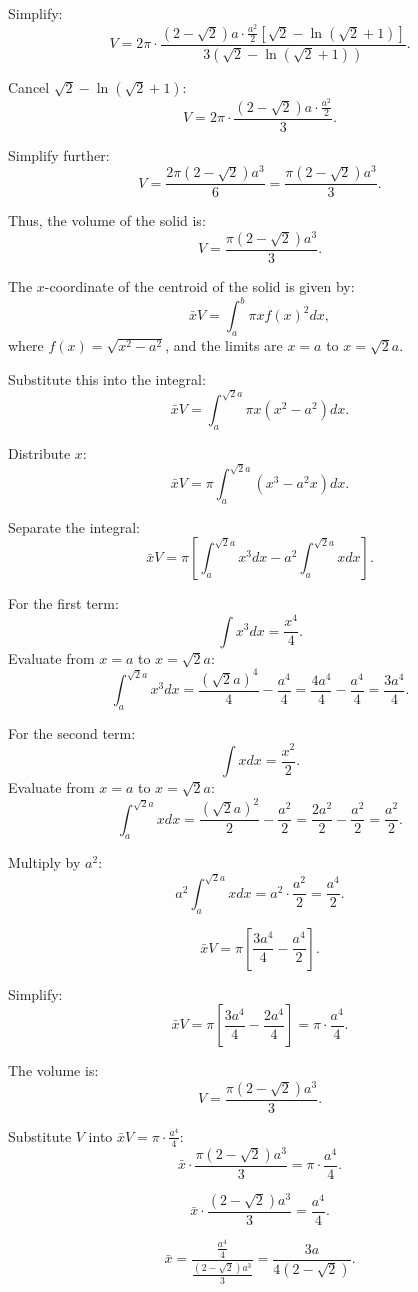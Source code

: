 \documentclass[12pt]{article}
\begin{document}
\begin{enumerate}
\begin{enumerate}
Simplify:
\[
V = 2 \pi \cdot \frac{(2 - \sqrt{2})a \cdot \frac{a^2}{2} \left[ \sqrt{2} - \ln(\sqrt{2} + 1) \right]}{3 \left( \sqrt{2} - \ln(\sqrt{2} + 1) \right)}.
\]

Cancel \(\sqrt{2} - \ln(\sqrt{2} + 1)\):
\[
V = 2 \pi \cdot \frac{(2 - \sqrt{2})a \cdot \frac{a^2}{2}}{3}.
\]

Simplify further:
\[
V = \frac{2\pi (2 - \sqrt{2}) a^3}{6} = \frac{\pi (2 - \sqrt{2}) a^3}{3}.
\]

Thus, the volume of the solid is:
\[
V = \frac{\pi (2 - \sqrt{2}) a^3}{3}.
\]

The \(x\)-coordinate of the centroid of the solid is given by:
\[
\bar{x} V = \int_a^b \pi x f(x)^2 dx,
\]
where \(f(x) = \sqrt{x^2 - a^2}\), and the limits are \(x = a\) to \(x = \sqrt{2}a\).


Substitute this into the integral:
\[
\bar{x} V = \int_a^{\sqrt{2}a} \pi x (x^2 - a^2) dx.
\]

Distribute \(x\):
\[
\bar{x} V = \pi \int_a^{\sqrt{2}a} (x^3 - a^2x) dx.
\]

Separate the integral:
\[
\bar{x} V = \pi \left[ \int_a^{\sqrt{2}a} x^3 dx - a^2 \int_a^{\sqrt{2}a} x dx \right].
\]


For the first term:
\[
\int x^3 dx = \frac{x^4}{4}.
\]
Evaluate from \(x = a\) to \(x = \sqrt{2}a\):
\[
\int_a^{\sqrt{2}a} x^3 dx = \frac{(\sqrt{2}a)^4}{4} - \frac{a^4}{4} = \frac{4a^4}{4} - \frac{a^4}{4} = \frac{3a^4}{4}.
\]

For the second term:
\[
\int x dx = \frac{x^2}{2}.
\]
Evaluate from \(x = a\) to \(x = \sqrt{2}a\):
\[
\int_a^{\sqrt{2}a} x dx = \frac{(\sqrt{2}a)^2}{2} - \frac{a^2}{2} = \frac{2a^2}{2} - \frac{a^2}{2} = \frac{a^2}{2}.
\]

Multiply by \(a^2\):
\[
a^2 \int_a^{\sqrt{2}a} x dx = a^2 \cdot \frac{a^2}{2} = \frac{a^4}{2}.
\]

\[
\bar{x} V = \pi \left[ \frac{3a^4}{4} - \frac{a^4}{2} \right].
\]

Simplify:
\[
\bar{x} V = \pi \left[ \frac{3a^4}{4} - \frac{2a^4}{4} \right] = \pi \cdot \frac{a^4}{4}.
\]

The volume is:
\[
V = \frac{\pi (2 - \sqrt{2}) a^3}{3}.
\]

Substitute \(V\) into \(\bar{x} V = \pi \cdot \frac{a^4}{4}\):
\[
\bar{x} \cdot \frac{\pi (2 - \sqrt{2}) a^3}{3} = \pi \cdot \frac{a^4}{4}.
\]

\[
\bar{x} \cdot \frac{(2 - \sqrt{2}) a^3}{3} = \frac{a^4}{4}.
\]

\[
\bar{x} = \frac{\frac{a^4}{4}}{\frac{(2 - \sqrt{2}) a^3}{3}} = \frac{3a}{4(2 - \sqrt{2})}.
\]


\end{enumerate}
\end{enumerate}
\end{document}
